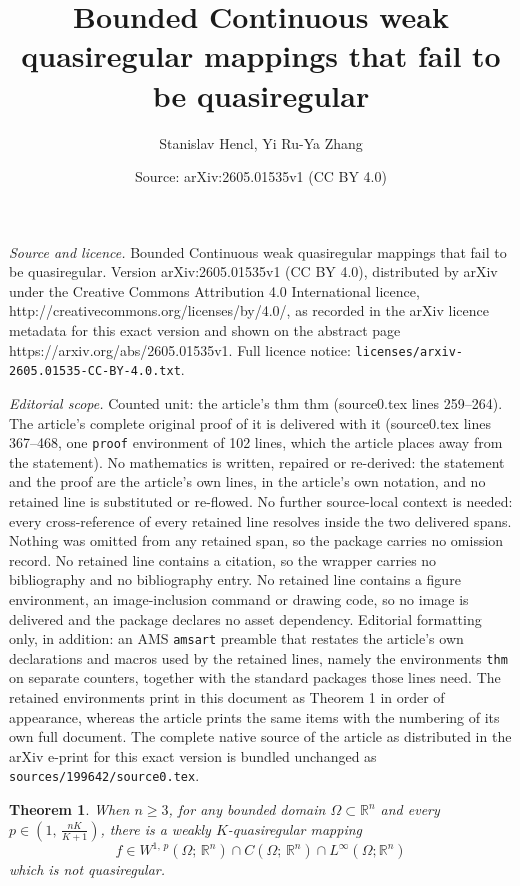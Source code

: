 \documentclass[10pt,a4paper]{amsart}
\title{Bounded Continuous weak quasiregular mappings that fail to be quasiregular}
\author{Stanislav Hencl, Yi Ru-Ya Zhang}
\date{Source: arXiv:2605.01535v1 (CC BY 4.0)}
\newtheorem{thm}{Theorem}
\begin{document}
\maketitle

\noindent\emph{Source and licence.} Bounded Continuous weak quasiregular mappings that fail to be quasiregular. Version arXiv:2605.01535v1 (CC BY 4.0), distributed by arXiv under the Creative Commons Attribution 4.0 International licence, http://creativecommons.org/licenses/by/4.0/, as recorded in the arXiv licence metadata for this exact version and shown on the abstract page https://arxiv.org/abs/2605.01535v1. Full licence notice: \texttt{licenses/arxiv-2605.01535-CC-BY-4.0.txt}.\par\smallskip

\noindent\textit{Editorial scope.} Counted unit: the article's thm thm (source0.tex lines 259--264). The article's complete original proof of it is delivered with it (source0.tex lines 367--468, one \texttt{proof} environment of 102 lines, which the article places away from the statement). No mathematics is written, repaired or re-derived: the statement and the proof are the article's own lines, in the article's own notation, and no retained line is substituted or re-flowed.  No further source-local context is needed: every cross-reference of every retained line resolves inside the two delivered spans.  Nothing was omitted from any retained span, so the package carries no omission record.  No retained line contains a citation, so the wrapper carries no bibliography and no bibliography entry.  No retained line contains a figure environment, an image-inclusion command or drawing code, so no image is delivered and the package declares no asset dependency.  Editorial formatting only, in addition: an AMS \texttt{amsart} preamble that restates the article's own declarations and macros used by the retained lines, namely the environments \texttt{thm} on separate counters, together with the standard packages those lines need.  The retained environments print in this document as Theorem 1 in order of appearance, whereas the article prints the same items with the numbering of its own full document.  The complete native source of the article as distributed in the arXiv e-print for this exact version is bundled unchanged as \texttt{sources/199642/source0.tex}.
\begin{thm}\label{main thm}
    When $n\ge3$, for any bounded domain $\Omega\subset \mathbb R^n$ and every $p\in \left(1,\,\frac{nK}{K+1}\right)$, there is a weakly $K$-quasiregular mapping 
    $$f\in W^{1,\,p}(\Omega;\,\mathbb R^n)\cap C(\Omega;\,\mathbb R^n)
   \cap L^\infty(\Omega;\mathbb R^n)$$
    which is not quasiregular.
\end{thm}
\end{document}
